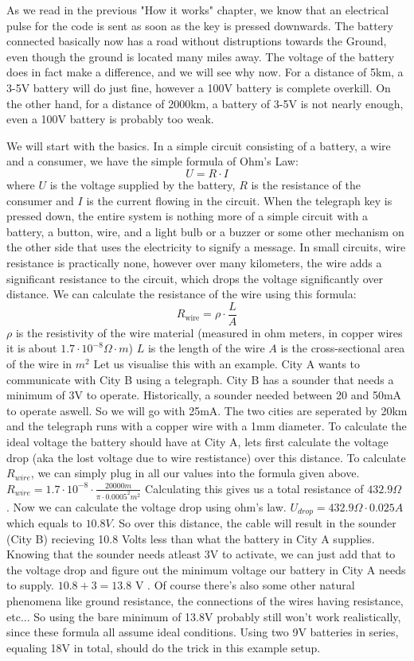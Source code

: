 As we read in the previous "How it works" chapter, we know that an electrical pulse for the code is sent as soon as the key is pressed downwards. The battery connected basically now has a road without distruptions towards the Ground, even though the ground is located many miles away. The voltage of the battery does in fact make a difference, and we will see why now. For a distance of 5km, a 3-5V battery will do just fine, however a 100V battery is complete overkill. On the other hand, for a distance of 2000km, a battery of 3-5V is not nearly enough, even a 100V battery is probably too weak. 

We will start with the basics. In a simple circuit consisting of a battery, a wire and a consumer, we have the simple formula of Ohm's Law:    
\[
U = R \cdot I
\]   
where $U$ is the voltage supplied by the battery, $R$ is the resistance of the consumer and $I$ is the current flowing in the circuit. 
When the telegraph key is pressed down, the entire system is nothing more of a simple circuit with a battery, a button, wire, and a light bulb or a buzzer or some other mechanism on the other side that uses the electricity to signify a message. 
In small circuits, wire resistance is practically none, however over many kilometers, the wire adds a significant resistance to the circuit, which drops the voltage significantly over distance. We can calculate the resistance of the wire using this formula:  
\[
R_{\text{wire}} = \rho \cdot \frac{L}{A}
\]
 $\rho$ is the resistivity of the wire material (measured in ohm meters, in copper wires it is about $1.7 \cdot 10^{-8}  \Omega \cdot m $)  
$L$ is the length of the wire
$A$ is the cross-sectional area of the wire in $m^2$
Let us visualise this with an example. City A wants to communicate with City B using a telegraph. City B has a sounder that needs a minimum of 3V to operate. Historically, a sounder needed between 20 and 50mA to operate aswell. So we will go with 25mA. The two cities are seperated by 20km and the telegraph runs with a copper wire with a 1mm diameter. To calculate the ideal voltage the battery should have at City A, lets first calculate the voltage drop (aka the lost voltage due to wire restistance) over this distance.  
To calculate $R_{wire}$, we can simply plug in all our values into the formula given above. $R_{wire} = 1.7 \cdot 10^{-8} \cdot \frac{20000m}{\pi \cdot 0.0005^2m^2}$ 
Calculating this gives us a total resistance of $432.9 \Omega$ . 
Now we can calculate the voltage drop using ohm's law. $U_{drop} = 432.9 \Omega \cdot 0.025A$ which equals to $10.8V$. So over this distance, the cable will result in the sounder (City B) recieving 10.8 Volts less than what the battery in City A supplies. Knowing that the sounder needs atleast 3V to activate, we can just add that to the voltage drop and figure out the minimum voltage our battery in City A needs to supply. $10.8 + 3 = 13.8$ V . Of course there's also some other natural phenomena like ground resistance, the connections of the wires having resistance, etc... So using the bare minimum of 13.8V probably still won't work realistically, since these formula all assume ideal conditions. Using two 9V batteries in series, equaling 18V in total, should do the trick in this example setup. 
